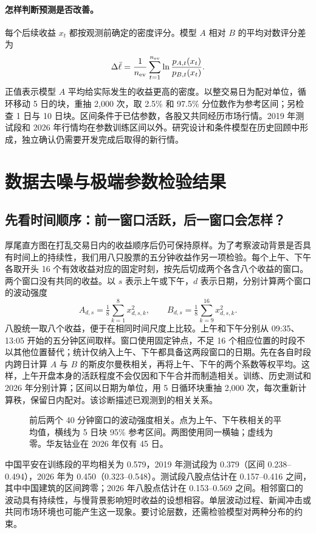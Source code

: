 \documentclass[11pt,a4paper]{article}
\newcommand{\chart}[4]{\begin{figure}[H]\centering\resizebox{#1\linewidth}{!}{}\caption{#3}\label{#4}\end{figure}}
\begin{document}
\paragraph{怎样判断预测是否改善。}
每个后续收益 $x_t$ 都按观测前确定的密度评分。模型 $A$ 相对 $B$ 的平均对数评分差为
\begin{equation}
 \Delta\bar\ell=\frac{1}{n_{\rm ev}}\sum_{t=1}^{n_{\rm ev}}\ln\frac{p_{A,t}(x_t)}{p_{B,t}(x_t)}.\label{eq:score}
\end{equation}
正值表示模型 $A$ 平均给实际发生的收益更高的密度。以整交易日为配对单位，循环移动 5 日的块，重抽 2,000 次，取 2.5\% 和 97.5\% 分位数作为参考区间；另检查 1 日与 10 日块。区间条件于已估参数，各股又共同经历市场行情。2019 年测试段和 2026 年行情均在参数训练区间以外。研究设计和条件模型在历史回顾中形成，独立确认仍需要开发完成后取得的新行情。

\clearpage
\section{数据去噪与极端参数检验结果}
\subsection{先看时间顺序：前一窗口活跃，后一窗口会怎样？}
厚尾直方图在打乱交易日内的收益顺序后仍可保持原样。为了考察波动背景是否具有时间上的持续性，我们用八只股票的五分钟收益作另一项检验。每个上午、下午各取开头 16 个有效收益对应的固定时刻，按先后切成两个各含八个收益的窗口。两个窗口没有共同的收益。以 $s$ 表示上午或下午，$d$ 表示日期，分别计算两个窗口的波动强度
\[
 A_{d,s}=\tfrac18\sum_{k=1}^{8}x_{d,s,k}^2,\qquad
 B_{d,s}=\tfrac18\sum_{k=9}^{16}x_{d,s,k}^2 .
\]
八股统一取八个收益，便于在相同时间尺度上比较。上午和下午分别从 09:35、13:05 开始的五分钟区间取样。窗口使用固定钟点，不足 16 个相应位置的时段不以其他位置替代；统计仅纳入上午、下午都具备这两段窗口的日期。先在各自时段内跨日计算 $A$ 与 $B$ 的斯皮尔曼秩相关，再将上午、下午的两个系数等权平均。这样，上午开盘本身的活跃程度不会仅因和下午合并而制造相关。训练、历史测试和 2026 年分别计算；区间以日期为单位，用 5 日循环块重抽 2,000 次，每次重新计算秩，保留日内配对。该诊断描述已观测到的相关关系。
\chart{.95}{persistence_forest}{前后两个 40 分钟窗口的波动强度相关。点为上午、下午秩相关的平均值，横线为 5 日块 95\% 参考区间。两图使用同一横轴；虚线为零。华友钴业在 2026 年仅有 45 日。}{fig:persistence}
中国平安在训练段的平均相关为 0.579，2019 年测试段为 0.379（区间 0.238--0.494），2026 年为 0.450（0.323--0.548）。测试段八股点估计在 0.157--0.416 之间，其中中国建筑的区间跨零；2026 年八股点估计在 0.153--0.569 之间。相邻窗口的波动具有持续性，与慢背景影响短时收益的设想相容。单层波动过程、新闻冲击或共同市场环境也可能产生这一现象。要讨论层数，还需检验模型对两种分布的约束。
\end{document}
